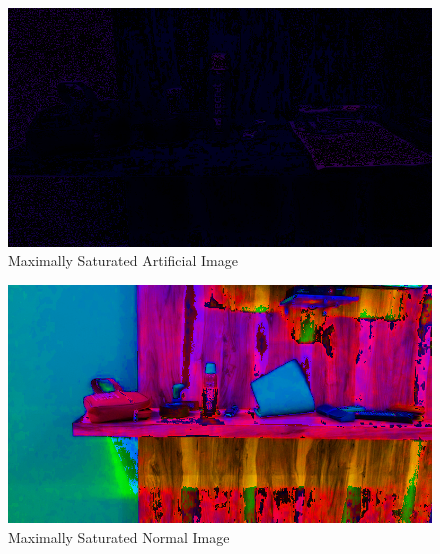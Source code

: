 \documentclass[]{article}
\begin{document}
\begin{figure}[h!]
  \begin{center}
    \includegraphics[scale=0.4]{recons_100_artificial}
    \caption[p3]{Maximally Saturated Artificial Image}
  \end{center}
\end{figure}
\begin{figure}[h!]
  \begin{center}
    \includegraphics[scale=0.4]{recons_100_normal}
    \caption[p3]{Maximally Saturated Normal Image}
  \end{center}
\end{figure}
\end{document}
